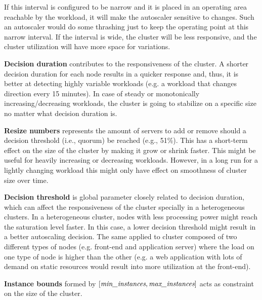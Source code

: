 If this interval is configured to be narrow and it is placed in an operating area reachable by the workload, it will make the autoscaler sensitive to changes. Such an autoscaler would do some thrashing just to keep the operating point at this narrow interval. If the interval is wide, the cluster will be less responsive, and the cluster utilization will have more space for variations. 

\textbf{Decision duration} contributes to the responsiveness of the cluster. A shorter decision duration for each node results in a quicker response and, thus, it is better at detecting highly variable workloads (e.g. a workload that changes direction every 15 minutes). 
 In case of steady or monotonically increasing/decreasing workloads, the cluster is going to stabilize on a specific size no matter what decision duration is. 

\textbf{Resize numbers} represents the amount of servers to add or remove should a decision threshold (i.e., quorum) be reached  (e.g., 51\%). 
This has a short-term effect on the size of the cluster by making it grow or shrink faster. This might be useful for heavily increasing or decreasing workloads. However, in a long run for a lightly changing workload this might only have effect on smoothness of cluster size over time. 

\textbf{Decision threshold} is global parameter closely related to decision duration, which can affect the responsiveness of the cluster specially in a heterogeneous clusters.
In a heterogeneous cluster, nodes with less processing power might reach the saturation level faster. In this case, a lower decision threshold might result in a better autoscaling decision. The same applied to cluster composed of two different types of nodes (e.g. front-end and application server) where the load on one type of node is higher than the other (e.g. a web application with lots of demand on static resources would result into more utilization at the front-end). 

\textbf{Instance bounds} formed by $[\text{{\it min\_instances}},\text{{\it max\_instances}}]$ acts as constraint on the size of the cluster. 

